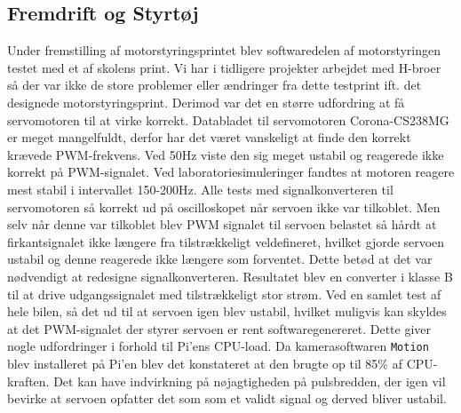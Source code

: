 \subsection{Fremdrift og Styrtøj} \label{sec:hwi_motor_styring}
Under fremstilling af motorstyringsprintet blev softwaredelen af motorstyringen testet med et af skolens print. 
Vi har i tidligere projekter arbejdet med H-broer så der var ikke de store problemer eller ændringer fra dette testprint ift. det designede motorstyringsprint.
Derimod var det en større udfordring at få servomotoren til at virke korrekt.  
Databladet til servomotoren Corona-CS238MG \cite{lib:Corona-CS238MG} er meget mangelfuldt, derfor har det været vanskeligt at finde den korrekt krævede PWM-frekvens. 
Ved 50Hz viste den sig meget ustabil og reagerede ikke korrekt på PWM-signalet. 
Ved laboratoriesimuleringer fandtes at motoren reagere mest stabil i intervallet 150-200Hz. 
Alle tests med signalkonverteren til servomotoren så korrekt ud på oscilloskopet når servoen ikke var tilkoblet. 
Men selv når denne var tilkoblet blev PWM signalet til servoen belastet så hårdt at firkantsignalet ikke længere fra tilstrækkeligt veldefineret, hvilket gjorde servoen ustabil og denne reagerede ikke længere som forventet. 
Dette betød at det var nødvendigt at redesigne signalkonverteren. 
Resultatet blev en converter i klasse B til at drive udgangssignalet med tilstrækkeligt stor strøm.
Ved en samlet test af hele bilen, så det ud til at servoen igen blev ustabil, hvilket muligvis kan skyldes at det PWM-signalet der styrer servoen er rent softwaregenereret. 
Dette giver nogle udfordringer i forhold til Pi'ens CPU-load. 
Da kamerasoftwaren \texttt{Motion} blev installeret på Pi'en blev det konstateret at den brugte op til 85\% af CPU-kraften. 
Det kan have indvirkning på nøjagtigheden på pulsbredden, der igen vil bevirke at servoen opfatter det som som et validt signal og derved bliver ustabil.

